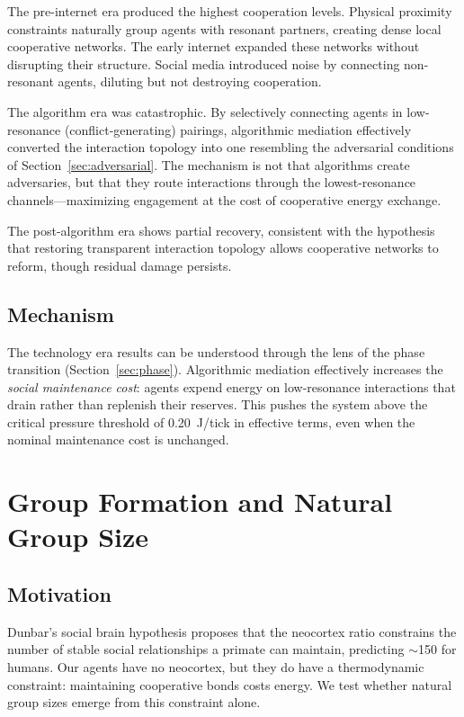 \documentclass[12pt,a4paper]{article}
\begin{document}
The pre-internet era produced the highest cooperation levels. Physical proximity constraints naturally group agents with resonant partners, creating dense local cooperative networks. The early internet expanded these networks without disrupting their structure. Social media introduced noise by connecting non-resonant agents, diluting but not destroying cooperation.

The algorithm era was catastrophic. By selectively connecting agents in low-resonance (conflict-generating) pairings, algorithmic mediation effectively converted the interaction topology into one resembling the adversarial conditions of Section~\ref{sec:adversarial}. The mechanism is not that algorithms create adversaries, but that they route interactions through the lowest-resonance channels---maximizing engagement at the cost of cooperative energy exchange.

The post-algorithm era shows partial recovery, consistent with the hypothesis that restoring transparent interaction topology allows cooperative networks to reform, though residual damage persists.

\subsection{Mechanism}

The technology era results can be understood through the lens of the phase transition (Section~\ref{sec:phase}). Algorithmic mediation effectively increases the \emph{social maintenance cost}: agents expend energy on low-resonance interactions that drain rather than replenish their reserves. This pushes the system above the critical pressure threshold of 0.20~J/tick in effective terms, even when the nominal maintenance cost is unchanged.

\section{Group Formation and Natural Group Size}
\label{sec:dunbar}

\subsection{Motivation}

Dunbar's social brain hypothesis \citep{dunbar1992} proposes that the neocortex ratio constrains the number of stable social relationships a primate can maintain, predicting $\sim$150 for humans. Our agents have no neocortex, but they do have a thermodynamic constraint: maintaining cooperative bonds costs energy. We test whether natural group sizes emerge from this constraint alone.
\end{document}
